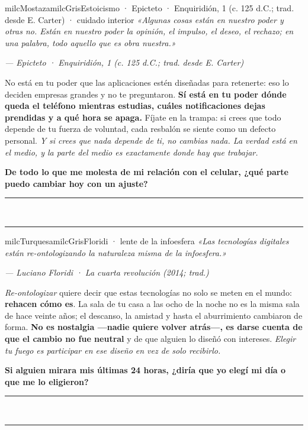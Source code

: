 \documentclass[11pt,letterpaper]{article}
\newcommand{\linead}[1]{\noindent\color{milcLinea}\rule{#1}{0.5pt}\color{milcNegro}}
\begin{document}
\begin{softbox}{milcMostaza}{milcGris}{Estoicismo · Epicteto · Enquiridión, 1 (c. 125 d.C.; trad. desde E. Carter) · cuidado interior}
\textit{«Algunas cosas están en nuestro poder y otras no. Están en nuestro poder la opinión, el impulso, el deseo, el rechazo; en una palabra, todo aquello que es obra nuestra.»}

{\footnotesize\itshape\color{milcNegro!70}--- Epicteto · Enquiridión, 1 (c. 125 d.C.; trad. desde E. Carter)}

No está en tu poder que las aplicaciones estén diseñadas para retenerte: eso lo deciden empresas grandes y no te preguntaron. \textbf{Sí está en tu poder dónde queda el teléfono mientras estudias, cuáles notificaciones dejas prendidas y a qué hora se apaga.} Fíjate en la trampa: si crees que todo depende de tu fuerza de voluntad, cada resbalón se siente como un defecto personal. \emph{Y si crees que nada depende de ti, no cambias nada. La verdad está en el medio, y la parte del medio es exactamente donde hay que trabajar.}

\textbf{De todo lo que me molesta de mi relación con el celular, ¿qué parte puedo cambiar hoy con un ajuste?}
\end{softbox}
\linead{\linewidth}\\[1mm]
\linead{\linewidth}

\begin{softbox}{milcTurquesa}{milcGris}{Floridi · lente de la infoesfera}
\textit{«Las tecnologías digitales están re-ontologizando la naturaleza misma de la infoesfera.»}

{\footnotesize\itshape\color{milcNegro!70}--- Luciano Floridi · La cuarta revolución (2014; trad.)}

\emph{Re-ontologizar} quiere decir que estas tecnologías no solo se meten en el mundo: \textbf{rehacen cómo es}. La sala de tu casa a las ocho de la noche no es la misma sala de hace veinte años; el descanso, la amistad y hasta el aburrimiento cambiaron de forma. \textbf{No es nostalgia ---nadie quiere volver atrás---, es darse cuenta de que el cambio no fue neutral} y de que alguien lo diseñó con intereses. \emph{Elegir tu fuego es participar en ese diseño en vez de solo recibirlo.}

\textbf{Si alguien mirara mis últimas 24 horas, ¿diría que yo elegí mi día o que me lo eligieron?}
\end{softbox}
\linead{\linewidth}\\[1mm]
\linead{\linewidth}
\end{document}

